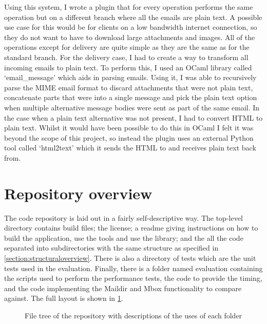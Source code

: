Using this system, I wrote a plugin that for every operation performs the same operation but on a different branch where all the emails are plain text. A possible use case for this would be for clients on a low bandwidth internet connection, so they do not want to have to download large attachments and images. All of the operations except for delivery are quite simple as they are the same as for the standard branch. For the delivery case, I had to create a way to transform all incoming emails to plain text. To perform this, I used an OCaml library called `email\_message' which aids in parsing emails. Using it, I was able to recursively parse the MIME email format to discard attachments that were not plain text, concatenate parts that were into a single message and pick the plain text option when multiple alternative message bodies were sent as part of the same email. In the case when a plain text alternative was not present, I had to convert HTML to plain text. Whilst it would have been possible to do this in OCaml I felt it was beyond the scope of this project, so instead the plugin uses an external Python tool called `html2text' which it sends the HTML to and receives plain text back from.

\section{Repository overview}

The code repository is laid out in a fairly self-descriptive way. The top-level directory contains build files; the license; a readme giving instructions on how to build the application, use the tools and use the library; and the all the code separated into subdirectories with the same structure as specified in \ref{section:structuraloverview}. There is also a directory of tests which are the unit tests used in the evaluation. Finally, there is a folder named evaluation containing the scripts used to perform the performance tests, the code to provide the timing, and the code implementing the Maildir and Mbox functionality to compare against. The full layout is shown in \ref{fig:repositorytree}.

\begin{figure}[h]
\footnotesize
{}
\caption{File tree of the repository with descriptions of the uses of each folder}
\label{fig:repositorytree}
\end{figure}
